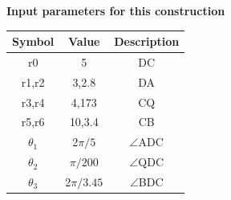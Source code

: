 \documentclass[journal,12pt,twocolumn]{IEEEtran}
\begin{document}
\begin{tableofcontents}
\begin{flushleft}
\newpage
\textbf{Input parameters for this construction}
\begin{center}
\begin{tabular}{|c|c|c|}
\hline
\textbf{Symbol}&{Value}&{Description}\\
\hline
r0&5&DC\\
\hline
r1,r2&3,2.8&DA\\
\hline
r3,r4&4,173&CQ\\
\hline
r5,r6&10,3.4&CB\\
\hline
${\theta}_1$& 2$\pi/5$&$ \angle $ADC\\ 
\hline
${\theta}_2$& $\pi/200$&$ \angle $QDC\\ 
\hline
${\theta}_3$& 2$\pi/3.45$&$ \angle $BDC\\ 
\hline 
\end{tabular}
\end{center}

\end{flushleft}
\end{tableofcontents}
\end{document}
